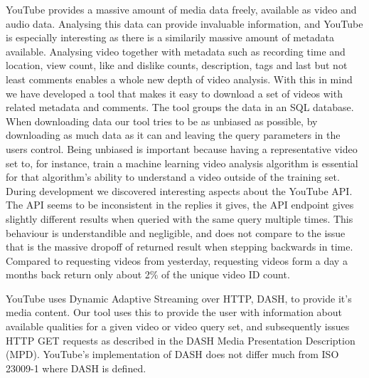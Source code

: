 YouTube provides a massive amount of media data freely, available as video and
audio data. Analysing this data can provide invaluable information, and YouTube
is especially interesting as there is a similarily massive amount of metadata
available. Analysing video together with metadata such as recording time and
location, view count, like and dislike counts, description, tags and last but
not least comments enables a whole new depth of video analysis. With this in 
mind we have developed a tool that makes it easy to download a set of videos
with related metadata and comments. The tool groups the data in an SQL database.
When downloading data our tool tries to be as unbiased as possible, by
downloading as much data as it can and leaving the query parameters in the users
control. Being unbiased is important because having a representative video set
to, for instance, train a machine learning video analysis algorithm is essential
for that algorithm's ability to understand a video outside of the training set.
During development we discovered interesting aspects about the YouTube API.
The API seems to be inconsistent in the replies it gives, the API endpoint gives
slightly different results when queried with the same query multiple times. This
behaviour is understandible and negligible, and does not compare to the issue
that is the massive dropoff of returned result when stepping backwards in time.
Compared to requesting videos from yesterday, requesting videos form a day a
months back return only about 2\% of the unique video ID count. 

YouTube uses Dynamic Adaptive Streaming over HTTP, DASH, to provide it's media
content. Our tool uses this to provide the user with information about available
qualities for a given video or video query set, and subsequently issues HTTP GET
requests as described in the DASH Media Presentation Description (MPD). 
YouTube's implementation of DASH does not differ much from ISO 23009-1 where 
DASH is defined.
